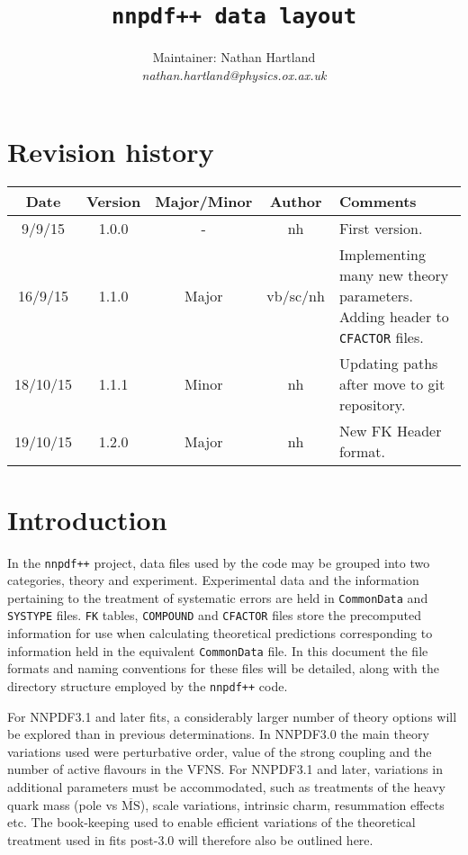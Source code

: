 \documentclass[11pt]{article}
\title{\tt{nnpdf++} data layout}
\author{Maintainer: Nathan Hartland\\ {\it nathan.hartland@physics.ox.ax.uk }}
\begin{document}
\maketitle
\tableofcontents
\clearpage
\section{Revision history}

\begin{table}[htp]
\begin{center}
\begin{tabular}{|c|c|c|c|p{50mm}|}
\hline
Date & Version & Major/Minor & Author & Comments\\
\hline\hline
9/9/15 & 1.0.0 & - & nh & First version.\\
\hline
16/9/15 & 1.1.0 & Major & vb/sc/nh & Implementing many \newline new theory parameters. \newline Adding header to {\tt CFACTOR} files.\\
\hline
18/10/15 & 1.1.1 & Minor & nh & Updating paths after move to git repository. \\
\hline
19/10/15 & 1.2.0 & Major & nh & New FK Header format. \\
\hline
\end{tabular}
\end{center}
\label{tab:revsum}
\end{table}%

\clearpage

\section{Introduction}

In the {\tt nnpdf++} project, data files used by the code may be grouped into two categories, theory and experiment. Experimental data and the information pertaining to the treatment of systematic errors are held in {\tt CommonData} and {\tt SYSTYPE} files. {\tt FK} tables, {\tt COMPOUND} and {\tt CFACTOR} files store the precomputed information for use when calculating theoretical predictions corresponding to information held in the equivalent {\tt CommonData} file. In this document the file formats and naming conventions for these files will be detailed, along with the directory structure employed by the {\tt nnpdf++} code.

For NNPDF3.1 and later fits, a considerably larger number of theory options will be explored than in previous determinations. In NNPDF3.0 the main theory variations used were perturbative order, value of the strong coupling and the number of active flavours in the VFNS. For NNPDF3.1 and later, variations in additional parameters must be accommodated, such as treatments of the heavy quark mass (pole vs $\overline{\mathrm{MS}}$), scale variations,  intrinsic charm, resummation effects etc. The book-keeping used to enable efficient variations of the theoretical treatment used in fits post-3.0 will therefore also be outlined here.
\end{document}
